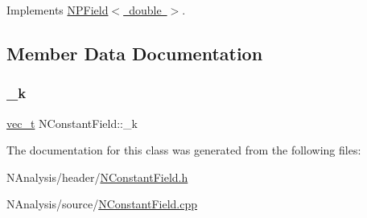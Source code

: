 Implements \mbox{\hyperlink{class_n_p_field_a6b92c4782bf41c0b81751821b93eb445}{N\+P\+Field$<$ double $>$}}.



\subsection{Member Data Documentation}
\mbox{\label{class_n_constant_field_adc7caf84cc8e117807c19c95cb47d1bc}} 
\subsubsection{\texorpdfstring{\_k}{\_k}}
{\footnotesize\ttfamily \mbox{\hyperlink{group___n_algebra_ga0a2cfc67e738a3d73e4f12098c4c07f6}{vec\+\_\+t}} N\+Constant\+Field\+::\+\_\+k\hspace{0.3cm}{\ttfamily [protected]}}



The documentation for this class was generated from the following files\+:\begin{DoxyCompactItemize}
\item 
N\+Analysis/header/\mbox{\hyperlink{_n_constant_field_8h}{N\+Constant\+Field.\+h}}\item 
N\+Analysis/source/\mbox{\hyperlink{_n_constant_field_8cpp}{N\+Constant\+Field.\+cpp}}\end{DoxyCompactItemize}
